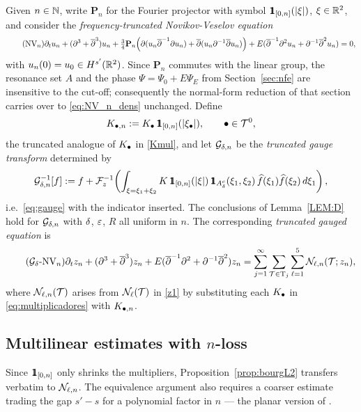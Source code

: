 Given $n\in\mathbb{N}$, write $\mathbf{P}_n$ for the Fourier projector with
symbol $\ind_{[0,n]}(|\xi|)$, $\xi\in\mathbb{R}^2$, and consider the
\emph{frequency-truncated Novikov-Veselov equation}
\begin{equation}\tag{NV$_n$}\label{eq:NV_n_dens}
\partial_t u_n + (\partial^3+\overline\partial^3) u_n
+ \tfrac34 \mathbf{P}_n\!\left( \partial(u_n\overline\partial^{-1}\partial u_n)
+ \overline\partial(u_n\partial^{-1}\overline\partial u_n) \right)
+ E(\overline\partial^{-1}\partial^2 u_n+\partial^{-1}\overline\partial^2 u_n)=0,
\end{equation}
with $u_n(0)=u_0\in H^{s'}(\mathbb{R}^2)$. Since $\mathbf{P}_n$ commutes
with the linear group, the resonance set $A$ and the phase
$\Psi=\Psi_0+E\Psi_E$ from Section~\ref{sec:nfe} are insensitive to
the cut-off; consequently the normal-form reduction of that section
carries over to \eqref{eq:NV_n_dens} unchanged. Define
\begin{equation}\label{eq:Kmul_n}
K_{\bul,n} := K_\bul\, \ind_{[0,n]}(|\xi_\bul|),
\qquad \bul\in\TT^0,
\end{equation}
the truncated analogue of $K_\bullet$ in \eqref{Kmul}, and let
$\mathcal{G}_{\delta,n}$ be the \emph{truncated gauge transform} determined by
\begin{equation}\label{eq:gauge_n_dens}
\Gc_{\dl,n}^{-1}[f] := f + \F_z^{-1}\!\left( \int_{\xi=\xi_1+\xi_2}
K\,\ind_{[0,n]}(|\xi|)\, \mathbbm{1}_{A^c_\dl}(\xi_1,\xi_2)\,
\widehat f(\xi_1)\widehat f(\xi_2)\, d\xi_1 \right),
\end{equation}
i.e.\ \eqref{eq:gauge} with the indicator inserted. The conclusions
of Lemma~\ref{LEM:D} hold for $\mathcal{G}_{\delta,n}$ with $\delta$, $\varepsilon$, $R$
all uniform in $n$. The corresponding \emph{truncated gauged
equation} is
\begin{equation}\label{eq:GNV_n_dens}\tag{$\Gc_\dl$-NV$_n$}
\dt z_n + (\partial^3+\overline\partial^3)z_n
+ E(\overline\partial^{-1}\partial^2+\partial^{-1}\overline\partial^2)z_n
= \sum_{j=1}^\infty \sum_{\TT\in\Tr_j}\sum_{\l=1}^5
\Ncal_{\l,n}(\TT;z_n),
\end{equation}
where $\mathcal{N}_{\ell,n}(\mathcal{T})$ arises from $\mathcal{N}_\ell(\mathcal{T})$ in \eqref{z1}
by substituting each $K_\bullet$ in \eqref{eq:multiplicadores} with
$K_{\bullet,n}$.

\subsection{Multilinear estimates with \texorpdfstring{$n$}{n}-loss}

Since $\ind_{[0,n]}$ only shrinks the multipliers,
Proposition~\ref{prop:bourgL2} transfers verbatim to $\mathcal{N}_{\ell,n}$.
The equivalence argument also requires a coarser estimate trading
the gap $s'-s$ for a polynomial factor in $n$ --- the planar version
of \cite[Lemma~5.2]{chcora}.

